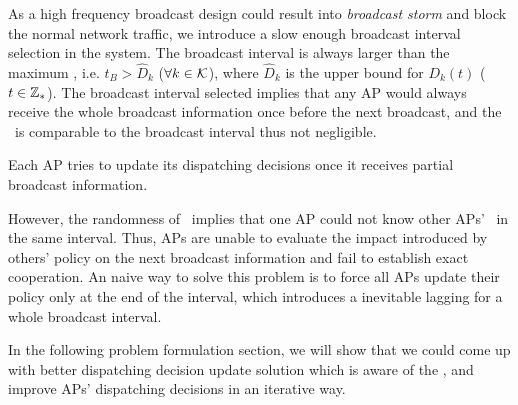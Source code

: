 As a high frequency broadcast design could result into \emph{broadcast storm} and block the normal network traffic, we introduce a slow enough broadcast interval selection in the system.
The broadcast interval is always larger than the maximum \brdelay, i.e. $t_B > \hat{D}_k$ ($\forall k\in\mathcal{K}$), where $\hat{D}_k$ is the upper bound for $D_{k}({t})$ ($t\in\mathbb{Z}_{*}$).
The broadcast interval selected implies that any AP would always receive the whole broadcast information once before the next broadcast, and the \brdelay~is comparable to the broadcast interval thus not negligible.

Each AP tries to update its dispatching decisions once it receives partial broadcast information.

However, the randomness of \brdelay~implies that one AP could not know other APs' \brdelay~in the same interval.
Thus, APs are unable to evaluate the impact introduced by others' policy on the next broadcast information and fail to establish exact cooperation.
An naive way to solve this problem is to force all APs update their policy only at the end of the interval, which introduces a inevitable lagging for a whole broadcast interval.

In the following problem formulation section, we will show that we could come up with better dispatching decision update solution which is aware of the \brdelay, and improve APs' dispatching decisions in an iterative way.
